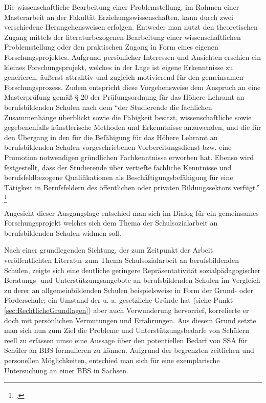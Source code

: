 Die wissenschaftliche Bearbeitung einer Problemstellung, im Rahmen einer Masterarbeit an der Fakultät Erziehungswissenschaften, kann durch zwei verschiedene Herangehensweisen erfolgen. Entweder man nutzt den theoretischen Zugang mittels der literaturbezogenen Bearbeitung einer wissenschaftlichen Problemstellung oder den praktischen Zugang in Form eines eigenen Forschungsprojektes.
Aufgrund persönlicher Interessen und Ansichten erschien ein kleines Forschungsprojekt, welches in der Lage ist eigene Erkenntnisse zu generieren, äußerst attraktiv und zugleich motivierend für den gemeinsamen Forschungsprozess. Zudem entspricht diese Vorgehensweise dem Anspruch an eine Masterprüfung gemäß § 20 der Prüfungsordnung für das Höhere Lehramt an berufsbildenden Schulen nach dem "`der Studierende die fachlichen Zusammenhänge überblickt sowie die Fähigkeit besitzt, wissenschaftliche sowie gegebenenfalls künstlerische Methoden und Erkenntnisse anzuwenden, und die für den Übergang in den für die Befähigung für das Höhere Lehramt an berufsbildenden Schulen vorgeschriebenen Vorbereitungsdienst bzw. eine Promotion notwendigen gründlichen Fachkenntnisse erworben hat. Ebenso wird festgestellt, dass der Studierende über vertiefte fachliche Kenntnisse und berufsfeldbezogene Qualifikationen als Beschäftigungsbefähigung für eine Tätigkeit in Berufsfeldern des öffentlichen oder privaten Bildungssektors verfügt."' \footcite[13]{TUDresden2010}

Angesicht dieser Ausgangslage entschied man sich im Dialog für ein gemeinsames Forschungsprojekt welches sich dem Thema der Schulsozialarbeit an berufsbildenden Schulen widmen soll. 

Nach einer grundlegenden Sichtung, der zum Zeitpunkt der Arbeit veröffentlichten Literatur zum Thema Schulsozialarbeit an berufsbildenden Schulen, zeigte sich eine deutliche geringere Repräsentativität sozialpädagogischer Beratungs- und Unterstützungsangebote an berufsbildenden Schulen im Vergleich zu derer an allgemeinbildenden Schulen beispielsweise in Form der Grund- oder Förderschule; ein Umstand der u. a. gesetzliche Gründe hat (siehe Punkt \ref{sec:RechtlicheGrundlagen}) aber auch Verwunderung hervorrief, korrelierte er doch mit persönlichen Vermutungen und Erfahrungen. Aus diesem Grund setzte man sich nun zum Ziel die Probleme und Unterstützungsbedarfe von Schülern reell zu erfassen umso eine Aussage über den potentiellen Bedarf von SSA für Schüler an BBS formulieren zu können. Aufgrund der begrenzten zeitlichen und personellen Möglichkeiten, entschied man sich für eine exemplarische Untersuchung an einer BBS in Sachsen.
 
